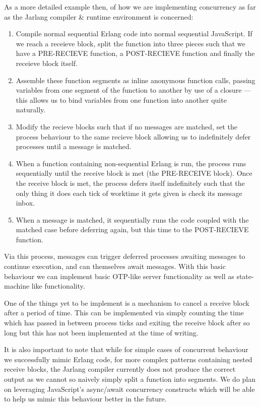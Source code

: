 \documentclass[twoside,12pt,titlepage,a4paper]{article}
\begin{document}
As a more detailed example then, of how we are implementing concurrency as far as the Jarlang compiler \& runtime environment is concerned: 

\begin{enumerate}
\item Compile normal sequential Erlang code into normal sequential JavaScript. If we reach a receieve block, split the function into three pieces such that we have a PRE-RECIEVE function, a POST-RECIEVE function and finally the receieve block itself.
\item Assemble these function segments as inline anonymous function calls, passing variables from one segment of the function to another by use of a closure --- this allows us to bind variables from one function into another quite naturally.
\item Modify the recieve blocks such that if no messages are matched, set the process behaviour to the same recieve block allowing us to indefinitely defer processes until a message is matched.
\item When a function containing non-sequential Erlang is run, the process runs sequentially until the receive block is met (the PRE-RECEIVE block). Once the receive block is met, the process defers itself indefinitely such that the only thing it does each tick of worktime it gets given is check its message inbox.
\item When a message is matched, it sequentially runs the code coupled with the matched case before deferring again, but this time to the POST-RECIEVE function.
\end{enumerate}

Via this process, messages can trigger deferred processes awaiting messages to continue execution, and can themselves await messages. With this basic behaviour we can implement basic OTP-like server functionality as well as state-machine like functionality.

One of the things yet to be implement is a mechanism to cancel a receive block after a period of time. This can be implemented via simply counting the time which has passed in between process ticks and exiting the receive block after so long but this has not been implemented at the time of writing.

It is also important to note that while for simple cases of concurrent behaviour we successfully mimic Erlang code, for more complex patterns containing nested receive blocks, the Jarlang compiler currently does not produce the correct output as we cannot so naively simply split a function into segments. We do plan on leveraging JavaScript's async/await concurrency constructs which will be able to help us mimic this behaviour better in the future.
\end{document}
